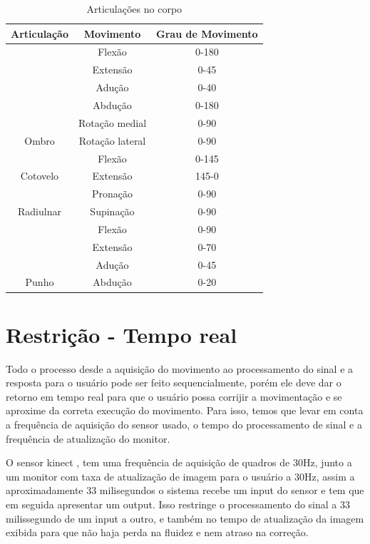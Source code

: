 \begin{table}[]
\centering
\caption{Articulações no corpo}
\label{Juntas no corpo}
\begin{tabular}{|c|c|c|}
\hline
\rowcolor[HTML]{C0C0C0}
Articulação                 & Movimento       & Grau de  Movimento \\ \hline
                            & Flexão          & 0-180              \\ \cline{2-3}
                            & Extensão        & 0-45               \\ \cline{2-3}
                            & Adução          & 0-40               \\ \cline{2-3}
                            & Abdução         & 0-180              \\ \cline{2-3}
                            & Rotação medial  & 0-90               \\ \cline{2-3}
\multirow{-6}{*}{Ombro}     & Rotação lateral & 0-90               \\ \hline
                            & Flexão          & 0-145              \\ \cline{2-3}
\multirow{-2}{*}{Cotovelo}  & Extensão        & 145-0              \\ \hline
                            & Pronação        & 0-90               \\ \cline{2-3}
\multirow{-2}{*}{Radiulnar} & Supinação       & 0-90               \\ \hline
                            & Flexão          & 0-90               \\ \cline{2-3}
                            & Extensão        & 0-70               \\ \cline{2-3}
                            & Adução          & 0-45               \\ \cline{2-3}
\multirow{-4}{*}{Punho}     & Abdução         & 0-20               \\ \hline
\end{tabular}
\end{table}

\section{Restrição - Tempo real}
\label{sec:restrição}
  Todo o processo desde a aquisição do movimento ao processamento do sinal e a
resposta para o usuário pode ser feito sequencialmente, porém ele deve dar o
retorno em tempo real para que o usuário possa corrijir a movimentação e se
aproxime da correta execução do movimento. Para isso, temos que levar em conta
a frequência de aquisição do sensor usado, o tempo do processamento de sinal e
a frequência de atualização do monitor.

  O sensor kinect \cite{microsoftResearch}, tem uma frequência de
aquisição de quadros de 30Hz, junto a um monitor com taxa de atualização de imagem
para o usuário a 30Hz, assim a aproximadamente 33 milisegundos o
sistema recebe um input do sensor e tem que em seguida apresentar um output. Isso
 restringe o processamento do sinal a 33 milissegundo de um input a outro, e
também no tempo de atualização da imagem exibida para que não haja perda na
fluidez e nem atraso na correção.
